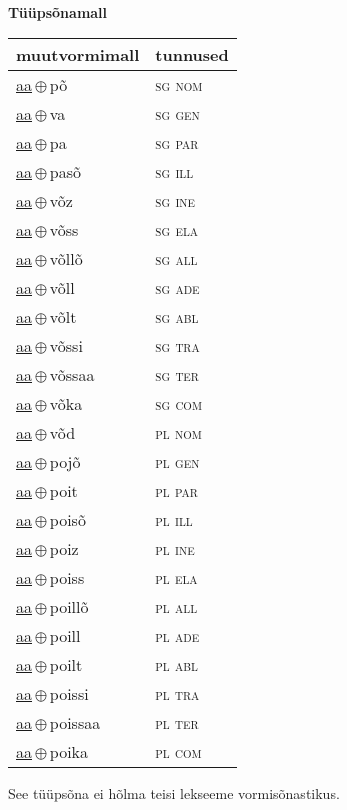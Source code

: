 \\

\vspace{3.5em}
\noindent \begin{minipage}{\textwidth}
\noindent \textbf{Tüüpsõnamall \,}\\

\begin{sideways}
\begin{tabular}{l l}
muutvormimall & tunnused \\
\hline
\underline{aa}\,$\oplus$\,põ & \textsc{ sg nom } \\
\underline{aa}\,$\oplus$\,va & \textsc{ sg gen } \\
\underline{aa}\,$\oplus$\,pa & \textsc{ sg par } \\
\underline{aa}\,$\oplus$\,pasõ & \textsc{ sg ill } \\
\underline{aa}\,$\oplus$\,võz & \textsc{ sg ine } \\
\underline{aa}\,$\oplus$\,võss & \textsc{ sg ela } \\
\underline{aa}\,$\oplus$\,võllõ & \textsc{ sg all } \\
\underline{aa}\,$\oplus$\,võll & \textsc{ sg ade } \\
\underline{aa}\,$\oplus$\,võlt & \textsc{ sg abl } \\
\underline{aa}\,$\oplus$\,võssi & \textsc{ sg tra } \\
\underline{aa}\,$\oplus$\,võssaa & \textsc{ sg ter } \\
\underline{aa}\,$\oplus$\,võka & \textsc{ sg com } \\
\underline{aa}\,$\oplus$\,võd & \textsc{ pl nom } \\
\underline{aa}\,$\oplus$\,pojõ & \textsc{ pl gen } \\
\underline{aa}\,$\oplus$\,poit & \textsc{ pl par } \\
\underline{aa}\,$\oplus$\,poisõ & \textsc{ pl ill } \\
\underline{aa}\,$\oplus$\,poiz & \textsc{ pl ine } \\
\underline{aa}\,$\oplus$\,poiss & \textsc{ pl ela } \\
\underline{aa}\,$\oplus$\,poillõ & \textsc{ pl all } \\
\underline{aa}\,$\oplus$\,poill & \textsc{ pl ade } \\
\underline{aa}\,$\oplus$\,poilt & \textsc{ pl abl } \\
\underline{aa}\,$\oplus$\,poissi & \textsc{ pl tra } \\
\underline{aa}\,$\oplus$\,poissaa & \textsc{ pl ter } \\
\underline{aa}\,$\oplus$\,poika & \textsc{ pl com } \\
\end{tabular}
\end{sideways}
\label{tab:tüüpsõnamall-aapõ}

\end{minipage}

 
\vspace{1em}
\noindent See tüüpsõna ei hõlma teisi lekseeme vormi\-sõnastikus.
